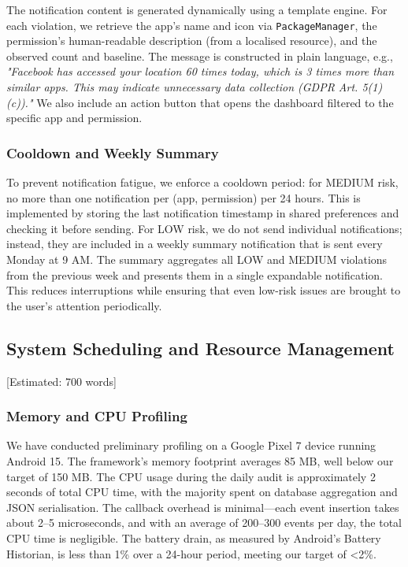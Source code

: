 The notification content is generated dynamically using a template engine. For each violation, we retrieve the app's name and icon via \texttt{PackageManager}, the permission's human-readable description (from a localised resource), and the observed count and baseline. The message is constructed in plain language, e.g., \textit{"Facebook has accessed your location 60 times today, which is 3 times more than similar apps. This may indicate unnecessary data collection (GDPR Art. 5(1)(c))."} We also include an action button that opens the dashboard filtered to the specific app and permission.

\subsubsection{Cooldown and Weekly Summary}

To prevent notification fatigue, we enforce a cooldown period: for MEDIUM risk, no more than one notification per (app, permission) per 24 hours. This is implemented by storing the last notification timestamp in shared preferences and checking it before sending. For LOW risk, we do not send individual notifications; instead, they are included in a weekly summary notification that is sent every Monday at 9 AM. The summary aggregates all LOW and MEDIUM violations from the previous week and presents them in a single expandable notification. This reduces interruptions while ensuring that even low-risk issues are brought to the user's attention periodically.

\subsection{System Scheduling and Resource Management} [Estimated: 700 words]

\subsubsection{Memory and CPU Profiling}

We have conducted preliminary profiling on a Google Pixel 7 device running Android 15. The framework's memory footprint averages 85 MB, well below our target of 150 MB. The CPU usage during the daily audit is approximately 2 seconds of total CPU time, with the majority spent on database aggregation and JSON serialisation. The callback overhead is minimal—each event insertion takes about 2–5 microseconds, and with an average of 200–300 events per day, the total CPU time is negligible. The battery drain, as measured by Android's Battery Historian, is less than 1\% over a 24-hour period, meeting our target of <2\%.

